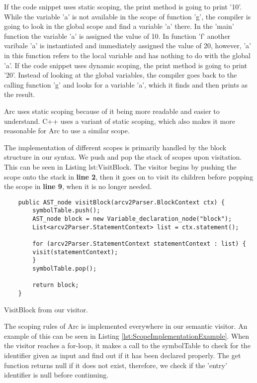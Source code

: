 If the code snippet uses static scoping, the print method is going to print '10'. While the variable 'a' is not available in the scope of function 'g', the compiler is going to look in the global scope and find a variable 'a' there. In the 'main' function the variable 'a' is assigned the value of 10. In function 'f' another varibale 'a' is instantiated and immediately assigned the value of 20, however, 'a' in this function refers to the local variable and has nothing to do with the global 'a'. If the code snippet uses dynamic scoping, the print method is going to print '20'. Instead of looking at the global variables, the compiler goes back to the calling function 'g' and looks for a variable 'a', which it finds and then prints as the result.

Arc uses static scoping because of it being more readable and easier to understand. C++ uses a variant of static scoping, which also makes it more reasonable for Arc to use a similar scope.

The implementation of different scopes is primarily handled by the block structure in our syntax. We push and pop the stack of scopes upon visitation. This can be seen in Listing {lst:VisitBlock}. The visitor begins by pushing the scope onto the stack in \textbf{line 2}, then it goes on to visit its children before popping the scope in \textbf{line 9}, when it is no longer needed.

\begin{listing}[htb!]
    \begin{verbatim}
    public AST_node visitBlock(arcv2Parser.BlockContext ctx) {
        symbolTable.push();
        AST_node block = new Variable_declaration_node("block");
        List<arcv2Parser.StatementContext> list = ctx.statement();

        for (arcv2Parser.StatementContext statementContext : list) {
        visit(statementContext);   
        }
        symbolTable.pop();

        return block;
    }
    \end{verbatim}
    \caption{VisitBlock from our visitor.}
    \label{lst:VisitBlock}
\end{listing}

The scoping rules of Arc is implemented everywhere in our semantic visitor. An example of this can be seen in Listing \ref{lst:ScopeImplementationExample}. When the visitor reaches a for-loop, it makes a call to the symbolTable to check for the identifier given as input and find out if it has been declared properly. The get function returns null if it does not exist, therefore, we check if the 'entry' identifier is null before continuing.

